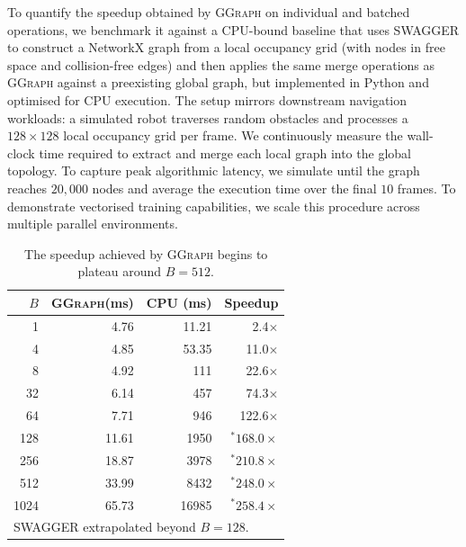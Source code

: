 \documentclass{article}
\newcommand{\sysname}{\textcolor{ggcolor}{\textsc{GGraph}}\xspace}
\begin{document}
To quantify the speedup obtained by \sysname on individual and batched operations, we benchmark it against a CPU-bound baseline that uses SWAGGER \cite{swagger} to construct a NetworkX \cite{SciPyProceedings_11} graph from a local occupancy grid (with nodes in free space and collision-free edges) and then applies the same merge operations as \sysname against a preexisting global graph, but implemented in Python and optimised for CPU execution. The setup mirrors downstream navigation workloads: a simulated robot traverses random obstacles and processes a $128 \times 128$ local occupancy grid per frame. We continuously measure the wall-clock time required to extract and merge each local graph into the global topology. To capture peak algorithmic latency, we simulate until the graph reaches $20{,}000$ nodes and average the execution time over the final $10$ frames. To demonstrate vectorised training capabilities, we scale this procedure across multiple parallel environments.
\begin{table}
    \vspace{-0.8em}
    \centering
    \scriptsize
    \setlength{\tabcolsep}{4pt}
    \begin{tabular}{r r r r}
        \toprule
        $B$ & \sysname (ms) & CPU (ms) & Speedup \\
        \midrule
        1    &  4.76  &   11.21  &  2.4$\times$ \\
        4    &  4.85  &   53.35  & 11.0$\times$ \\
        8    &  4.92  &  111  & 22.6$\times$ \\
        32   &  6.14  &  457  & 74.3$\times$ \\
        64   &  7.71  &  946  & 122.6$\times$ \\
        128  & 11.61  &  1950  & $^*168.0\times$ \\
        256  & 18.87  &  3978  & $^*210.8\times$ \\
        512  & 33.99  &  8432  & $^*248.0\times$ \\
        \midrule
        1024 & 65.73  & 16985  & $^*258.4\times$ \\
        \bottomrule
        \multicolumn{4}{l}{\scriptsize *SWAGGER extrapolated beyond $B{=}128$.}
    \end{tabular}
    \caption{The speedup achieved by \sysname begins to plateau around $B=512$.}
    \label{tab:batched_wall_time}
    \vspace{-2.6em}
\end{table}
\end{document}
